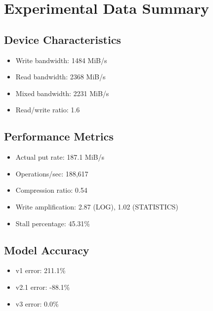 \documentclass[11pt]{article}
\begin{document}
\section{Experimental Data Summary}

\subsection{Device Characteristics}
\begin{itemize}
    \item Write bandwidth: 1484 MiB/s
    \item Read bandwidth: 2368 MiB/s
    \item Mixed bandwidth: 2231 MiB/s
    \item Read/write ratio: 1.6
\end{itemize}

\subsection{Performance Metrics}
\begin{itemize}
    \item Actual put rate: 187.1 MiB/s
    \item Operations/sec: 188,617
    \item Compression ratio: 0.54
    \item Write amplification: 2.87 (LOG), 1.02 (STATISTICS)
    \item Stall percentage: 45.31\%
\end{itemize}

\subsection{Model Accuracy}
\begin{itemize}
    \item v1 error: 211.1\%
    \item v2.1 error: -88.1\%
    \item v3 error: 0.0\%
\end{itemize}
\end{document}
